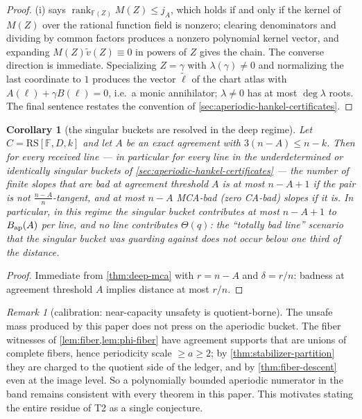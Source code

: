 \documentclass[11pt]{article}
\newtheorem{corollary}[theorem]{Corollary}
\theoremstyle{definition}
\theoremstyle{remark}
\newtheorem{remark}[theorem]{Remark}
\newcommand{\F}{\mathbb{F}}
\newcommand{\RS}{\mathrm{RS}}
\begin{document}
\begin{proof}
(i) says $\operatorname{rank}_{\F(Z)}M(Z)\le j_A$, which holds if and only if the kernel of $M(Z)$ over the rational function field is nonzero; clearing denominators and dividing by common factors produces a nonzero polynomial kernel vector, and expanding $M(Z)\widetilde v(Z)\equiv0$ in powers of $Z$ gives the chain. The converse direction is immediate. Specializing $Z=\gamma$ with $\lambda(\gamma)\ne0$ and normalizing the last coordinate to $1$ produces the vector $\widetilde\ell$ of the chart atlas with $A(\ell)+\gamma B(\ell)=0$, i.e.\ a monic annihilator; $\lambda\ne0$ has at most $\deg\lambda$ roots. The final sentence restates the convention of \cref{sec:aperiodic-hankel-certificates}.
\end{proof}

\begin{corollary}[the singular buckets are resolved in the deep regime]\label{cor:singular-deep}
Let $C=\RS[\F,D,k]$ and let $A$ be an exact agreement with $3(n-A)\le n-k$. Then for every received line --- in particular for every line in the underdetermined or identically singular buckets of \cref{sec:aperiodic-hankel-certificates} --- the number of finite slopes that are bad at agreement threshold $A$ is at most $n-A+1$ if the pair is not $\frac{n-A}n$-tangent, and at most $n-A$ MCA-bad \textup(zero CA-bad\textup) slopes if it is. In particular, in this regime the singular bucket contributes at most $n-A+1$ to $B_{\rm ap}(A)$ per line, and no line contributes $\Theta(q)$: the ``totally bad line'' scenario that the singular bucket was guarding against does not occur below one third of the distance.
\end{corollary}

\begin{proof}
Immediate from \cref{thm:deep-mca} with $r=n-A$ and $\delta=r/n$: badness at agreement threshold $A$ implies distance at most $r/n$.
\end{proof}

\begin{remark}[calibration: near-capacity unsafety is quotient-borne]\label{rem:quotient-borne}
The unsafe mass produced by this paper does not press on the aperiodic bucket. The fiber witnesses of \cref{lem:fiber,lem:phi-fiber} have agreement supports that are unions of complete fibers, hence periodicity scale $\ge a\ge2$; by \cref{thm:stabilizer-partition} they are charged to the quotient side of the ledger, and by \cref{thm:fiber-descent} even at the image level. So a polynomially bounded aperiodic numerator in the band remains consistent with every theorem in this paper. This motivates stating the entire residue of T2 as a single conjecture.
\end{remark}
\end{document}
